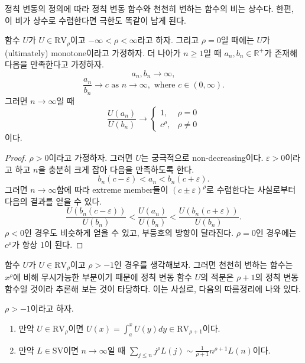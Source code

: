 \documentclass[b5paper,]{scrbook}
\theoremstyle{plain}
\theoremstyle{definition}
\numberwithin{equation}{section}
\let\BeginKnitrBlock\begin \let\EndKnitrBlock\end
\begin{document}
정칙 변동의 정의에 따라 정칙 변동 함수와 천천히 변하는 함수의 비는 상수다. 한편, 이 비가 상수로 수렴한다면 극한도 똑같이 남게 된다.

\BeginKnitrBlock{lemma}[정칙 변동 함수의 비의 수렴에 관한 따름정리]
\protect\hypertarget{lem:unnamed-chunk-448}{}{\label{lem:unnamed-chunk-448} {} }함수 \(U\)가 \(U\in \text{RV}_{\rho}\)이고 \(-\infty < \rho < \infty\)라고 하자. 그리고 \(\rho=0\)일 때에는 \(U\)가 (ultimately) monotone이라고 가정하자. 더 나아가 \(n\geq 1\)일 때 \(a_{n}, b_{n}\in\mathbb{R}^{+}\)가 존재해 다음을 만족한다고 가정하자.
\[a_{n}, b_{n}\rightarrow \infty,\]
\[\frac{a_{n}}{b_{n}}\rightarrow c \text{ as } n \rightarrow\infty, \text{ where } c\in(0,\infty).\]
그러면 \(n\rightarrow\infty\)일 때
\[
\frac{U(a_{n})}{U(b_{n})}\rightarrow
\begin{cases}
1, & \rho=0\\
c^{\rho}, & \rho\neq 0
\end{cases}
\]
이다.
\EndKnitrBlock{lemma}

\BeginKnitrBlock{proof}
{}\(\rho >0\)이라고 가정하자. 그러면 \(U\)는 궁극적으로 non-decreasing이다. \(\varepsilon >0\)이라고 하고 \(n\)을 충분히 크게 잡아 다음을 만족하도록 한다.
\[b_{n}(c-\varepsilon) < a_{n} < b_{n}(c+\varepsilon).\]
그러면 \(n\rightarrow \infty\)함에 따라 extreme member들이 \((c\pm \varepsilon)^{\rho}\)로 수렴한다는 사실로부터 다음의 결과를 얻을 수 있다.
\[\frac{ U(b_{n}(c-\varepsilon))}{U(b_{n})} < \frac{U(a_{n})}{U(b_{n})} < \frac{U(b_{n}(c+\varepsilon))}{U(b_{n})}.\]
\(\rho <0\)인 경우도 비슷하게 얻을 수 있고, 부등호의 방향이 달라진다. \(\rho=0\)인 경우에는 \(c^{\rho}\)가 항상 1이 된다.
\EndKnitrBlock{proof}

함수 \(U\)가 \(U\in \text{RV}_{\rho}\)이고 \(\rho >-1\)인 경우를 생각해보자. 그러면 천천히 변하는 함수는 \(x^{\rho}\)에 비해 무시가능한 부분이기 때문에 정칙 변동 함수 \(U\)의 적분은 \(\rho+1\)의 정칙 변동 함수일 것이라 추론해 보는 것이 타당하다. 이는 사실로, 다음의 따름정리에 나와 있다.

\BeginKnitrBlock{lemma}[정칙 변동 함수의 적분]
\protect\hypertarget{lem:unnamed-chunk-450}{}{\label{lem:unnamed-chunk-450} {} }\(\rho>-1\)이라고 하자.

\begin{enumerate}
\def\labelenumi{\arabic{enumi}.}
\item
  만약 \(U\in \text{RV}_{\rho}\)이면 \(U(x)=\int_{a}^{x}U(y)dy \in \text{RV}_{\rho +1}\)이다.
\item
  만약 \(L\in \text{SV}\)이면 \(n\rightarrow \infty\)일 때 \(\sum_{j\leq n}j^{\rho}L(j) \sim \frac{1}{\rho + 1}n^{\rho + 1}L(n)\)이다.
\end{enumerate}
\EndKnitrBlock{lemma}
\end{document}
